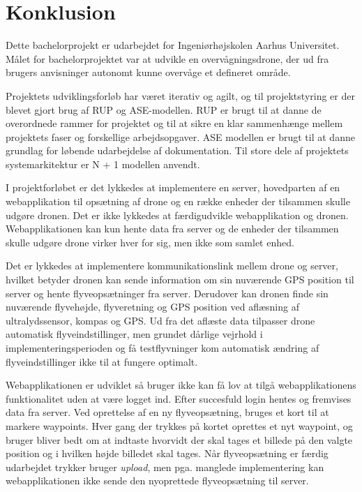 \section{Konklusion}

Dette bachelorprojekt er udarbejdet for Ingeniørhøjskolen Aarhus Universitet. Målet for bachelorprojektet var at udvikle en overvågningsdrone, der ud fra brugers anvisninger autonomt kunne overvåge et defineret område. 

Projektets udviklingsforløb har været iterativ og agilt, og til projektstyring er der blevet gjort brug af RUP og ASE-modellen. RUP er brugt til at danne de overordnede rammer for projektet og til at sikre en klar sammenhænge mellem projektets faser og forskellige arbejdsopgaver. ASE modellen er brugt til at danne grundlag for løbende udarbejdelse af dokumentation. Til store dele af projektets systemarkitektur er N + 1 modellen anvendt.

I projektforløbet er det lykkedes at implementere en server, hovedparten af en webapplikation til opsætning af drone og en række enheder der tilsammen skulle udgøre dronen. Det er ikke lykkedes at færdigudvikle webapplikation og dronen. Webapplikationen kan kun hente data fra server og de enheder der tilsammen skulle udgøre drone virker hver for sig, men ikke som samlet enhed.

Det er lykkedes at implementere kommunikationslink mellem drone og server, hvilket betyder dronen kan sende information om sin nuværende GPS position til server og hente flyveopsætninger fra server. Derudover kan dronen finde sin nuværende flyvehøjde, flyveretning og GPS position ved aflæsning af ultralydssensor, kompas og GPS. Ud fra det aflæste data tilpasser drone automatisk flyveindstillinger, men grundet dårlige vejrhold i implementeringsperioden og få testflyvninger kom automatisk ændring af flyveindstillinger ikke til at fungere optimalt.

Webapplikationen er udviklet så bruger ikke kan få lov at tilgå webapplikationens funktionalitet uden at være logget ind. Efter succesfuld login hentes og fremvises data fra server. Ved oprettelse af en ny flyveopsætning, bruges et kort til at markere waypoints. Hver gang der trykkes på kortet oprettes et nyt waypoint, og bruger bliver bedt om at indtaste hvorvidt der skal tages et billede på den valgte position og i hvilken højde billedet skal tages.
Når flyveopsætning er færdig udarbejdet trykker bruger \textit{upload}, men pga. manglede implementering kan webapplikationen ikke sende den nyoprettede flyveopsætning til server. 

